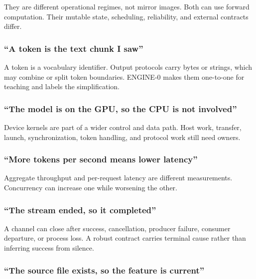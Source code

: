 \documentclass[
  10pt,
]{article}
\begin{document}
They are different operational regimes, not mirror images. Both can use
forward computation. Their mutable state, scheduling, reliability, and
external contracts differ.

\subsubsection{``A token is the text chunk I
saw''}\label{a-token-is-the-text-chunk-i-saw}

A token is a vocabulary identifier. Output protocols carry bytes or
strings, which may combine or split token boundaries. ENGINE-0 makes
them one-to-one for teaching and labels the simplification.

\subsubsection{``The model is on the GPU, so the CPU is not
involved''}\label{the-model-is-on-the-gpu-so-the-cpu-is-not-involved}

Device kernels are part of a wider control and data path. Host work,
transfer, launch, synchronization, token handling, and protocol work
still need owners.

\subsubsection{``More tokens per second means lower
latency''}\label{more-tokens-per-second-means-lower-latency}

Aggregate throughput and per-request latency are different measurements.
Concurrency can increase one while worsening the other.

\subsubsection{``The stream ended, so it
completed''}\label{the-stream-ended-so-it-completed}

A channel can close after success, cancellation, producer failure,
consumer departure, or process loss. A robust contract carries terminal
cause rather than inferring success from silence.

\subsubsection{``The source file exists, so the feature is
current''}\label{the-source-file-exists-so-the-feature-is-current}
\end{document}
